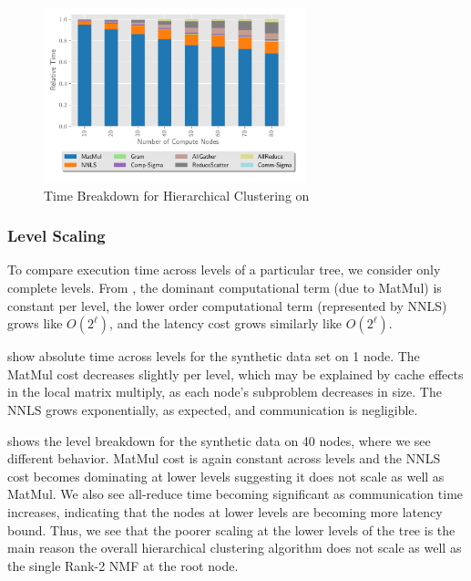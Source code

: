 \begin{figure}
\begin{center}
\includegraphics[height=2in, width=\columnwidth]{plots/realworld_hier_strongscaling.pdf}
\caption{Time Breakdown for Hierarchical Clustering on \image{}}
\label{fig:rwhierstrongscaling}
\end{center}
\end{figure}

\subsubsection{Level Scaling}

To compare execution time across levels of a particular tree, we consider only complete levels. 
From , the dominant computational term (due to MatMul) is constant per level, the lower order 
computational term (represented by NNLS) grows like $O(2^\ell)$, and the latency cost grows similarly like $O(2^\ell)$. 

 show absolute time across levels for the synthetic data set on 1 node.
The MatMul cost decreases slightly per level, which may be explained by cache effects in the local matrix multiply, as each node's subproblem decreases in size. 
The NNLS grows exponentially, as expected, and communication is negligible.

 shows the level breakdown for the synthetic data on 40 nodes, where we see different behavior.
MatMul cost is again constant across levels and the NNLS cost becomes dominating at lower levels suggesting it does not scale as well as MatMul. 
We also see all-reduce time becoming significant as communication time increases, indicating that the nodes at lower levels are becoming more latency bound.
Thus, we see that the poorer scaling at the lower levels of the tree is the main reason the overall hierarchical clustering algorithm does not scale as well as the single Rank-2 NMF at the root node.

